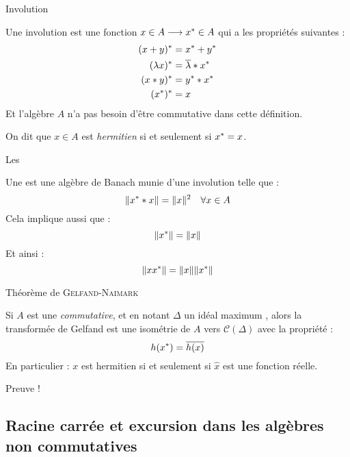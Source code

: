 \documentclass[11pt, xcolor=table]{beamer}
\begin{document}
\begin{frame}{Involution}
    \begin{mydef}[Involution]
        Une involution est une fonction $x \in A \longrightarrow x^\ast \in A$ qui a les propriétés suivantes :
        \begin{align*}
            (x + y) ^\ast  &= x^\ast + y^\ast\\
            ( \lambda x) ^\ast &= \overline{\lambda} * x^\ast\\
            ( x * y) ^\ast &= y ^\ast * x^\ast\\
            (x^\ast)^\ast &= x 
        \end{align*}
        Et l'algèbre $A$ n'a pas besoin d'être commutative dans cette définition.

        On dit que $x \in A $ est \emph{hermitien} si et seulement si $x^\ast = x $.
    \end{mydef}
\end{frame}

\begin{frame}{Les \Calgs}
    \begin{mydef}
        Une \Calg est une algèbre de Banach munie d'une involution telle que : 
        \[
            \| x^\ast * x \| = \| x \|^2 \quad \forall x \in A
        \]
        Cela implique aussi que :
        \[
            \| x^\ast \| = \| x \|
        \]
        Et ainsi :
        \[
            \| x x^\ast \| = \| x \| \| x^\ast \|
        \]
    \end{mydef}
\end{frame}

\begin{frame}{Théorème de \textsc{Gelfand}-\textsc{Naimark}}
    \begin{myth}
        Si $A$ est une \Calg \emph{commutative}, et en notant $\Delta$ un idéal maximum , alors la transformée de Gelfand est une isométrie de $A$ vers $\mathcal{C}(\Delta)$
        avec la propriété :
        \[
            h(x^\ast) = \overline{h(x)}
        \]
        En particulier : $x$ est hermitien si et seulement si $\hat{x}$ est une fonction réelle.
    \end{myth}
    \pause 
    Preuve !
\end{frame}

\subsection{Racine carrée et excursion dans les algèbres non commutatives}
\end{document}
